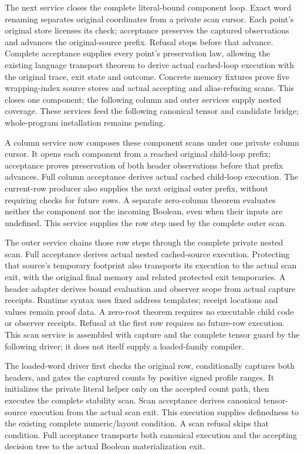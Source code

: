 The next service closes the complete literal-bound component loop. Exact word
renaming separates original coordinates from a private scan cursor. Each point's
original store licenses its check; acceptance preserves the captured observations
and advances the original-source prefix. Refusal stops before that advance.
Complete acceptance supplies every point's preservation law, allowing the
existing language transport theorem to derive actual cached-loop execution with
the original trace, exit state and outcome. Concrete memory fixtures prove five
wrapping-index source stores and actual accepting and alias-refusing scans.
This closes one component; the following column and outer services supply nested
coverage. These services feed the following canonical tensor and candidate
bridge; whole-program installation remains pending.

A column service now composes these component scans under one private column
cursor. It opens each component from a reached original child-loop prefix;
acceptance proves preservation of both header observations before that prefix
advances. Full column acceptance derives actual cached child-loop execution.
The current-row producer also supplies the next original outer prefix, without
requiring checks for future rows. A separate zero-column theorem evaluates
neither the component nor the incoming Boolean, even when their inputs are
undefined. This service supplies the row step used by the complete outer scan.

The outer service chains those row steps through the complete private nested
scan. Full acceptance derives actual nested cached-source execution. Protecting
that source's temporary footprint also transports its execution to the actual
scan exit, with the original final memory and related protected exit temporaries.
A header adapter derives bound evaluation and observer scope from actual capture
receipts. Runtime syntax uses fixed address templates; receipt locations and
values remain proof data. A zero-root theorem requires no executable child code
or observer receipts. Refusal at the first row requires no future-row execution.
This scan service is assembled with capture and the complete tensor guard by
the following driver; it does not itself supply a loaded-family compiler.

The loaded-word driver first checks the original row, conditionally captures
both headers, and gates the captured counts by positive signed profile ranges.
It initializes the private literal helper only on the accepted count path,
then executes the complete stability scan. Scan acceptance derives canonical
tensor-source execution from the actual scan exit. This execution supplies
definedness to the existing complete numeric/layout condition. A scan refusal
skips that condition. Full acceptance transports both canonical execution and
the accepting decision tree to the actual Boolean materialization exit.

